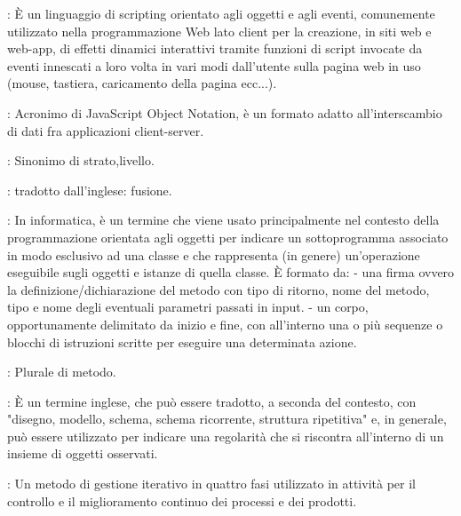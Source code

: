 {		: È un linguaggio di scripting orientato agli oggetti e agli eventi, comunemente utilizzato nella programmazione Web lato client per la creazione, in siti web e web-app, di effetti dinamici interattivi tramite funzioni di script invocate da eventi innescati a loro volta in vari modi dall'utente sulla pagina web in uso (mouse, tastiera, caricamento della pagina ecc...).
	
		: Acronimo di JavaScript Object Notation, è un formato adatto all'interscambio di dati fra applicazioni client-server.
	
	
		: Sinonimo di strato,livello.
	
		: tradotto dall'inglese: fusione.
		
		: In informatica, è un termine che viene usato principalmente nel contesto della programmazione orientata agli oggetti per indicare un sottoprogramma associato in modo esclusivo ad una classe e che rappresenta (in genere) un'operazione eseguibile sugli oggetti e istanze di quella classe. È formato da:
- una firma ovvero la definizione/dichiarazione del metodo con tipo di ritorno, nome del metodo, tipo e nome degli eventuali parametri passati in input.
- un corpo, opportunamente delimitato da inizio e fine, con all'interno una o più sequenze o blocchi di istruzioni scritte per eseguire una determinata azione.

		: Plurale di metodo.
		

		: È un termine inglese, che può essere tradotto, a seconda del contesto, con "disegno, modello, schema, schema ricorrente, struttura ripetitiva" e, in generale, può essere utilizzato per indicare una regolarità che si riscontra all'interno di un insieme di oggetti osservati.
		
		: Un metodo di gestione iterativo in quattro fasi utilizzato in attività per il controllo e il miglioramento continuo dei processi e dei prodotti.
		
}
